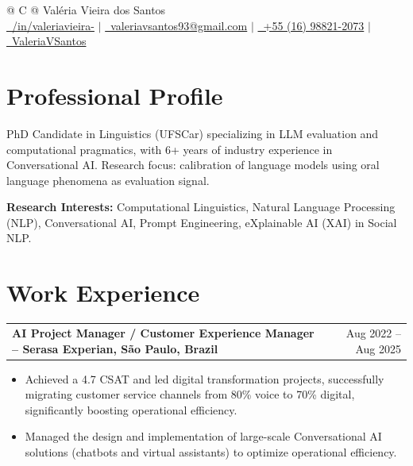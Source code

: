 \documentclass[a4paper]{article}
\makeatletter
\newenvironment{joblong}[2]
    {
    \begin{tabularx}{\linewidth}{@{}X r@{}}
    \textbf{#1} & #2 \\[3.75pt]
    \end{tabularx}
    \begin{minipage}[t]{\linewidth}
    \begin{itemize}[nosep,after=\strut, leftmargin=1em, itemsep=3pt,label=--]
    }
    {
    \end{itemize}
    \end{minipage}
    }
\makeatother
\begin{document}
\pagestyle{empty}

\begin{tabularx}{\linewidth}{@{} C @{}}
\Huge{Valéria Vieira dos Santos} \\[7.5pt]
\href{https://linkedin.com/in/valeriavieira-}{\raisebox{-0.05\height}\faLinkedin\ /in/valeriavieira-} $|$
\href{mailto:valeriavsantos93@gmail.com}{\raisebox{-0.05\height}\faEnvelope \ valeriavsantos93@gmail.com} $|$
\href{tel:+5516988212073}{\raisebox{-0.05\height}\faMobile \ +55 (16) 98821-2073} $|$
\href{https://github.com/ValeriaVSantos}{\raisebox{-0.05\height}\faGithub\ ValeriaVSantos} \\
\end{tabularx}


\section{Professional Profile}
PhD Candidate in Linguistics (UFSCar) specializing in LLM evaluation 
and computational pragmatics, with 6+ years of industry experience 
in Conversational AI. Research focus: calibration of language models 
using oral language phenomena as evaluation signal.
\vspace{5pt}

\textbf{Research Interests:} Computational Linguistics, Natural Language Processing (NLP), Conversational AI, Prompt Engineering, eXplainable AI (XAI) in Social NLP.


\section{Work Experience}

\begin{joblong}{AI Project Manager / Customer Experience Manager -- Serasa Experian, São Paulo, Brazil}{Aug 2022 – Aug 2025}
\item Achieved a 4.7 CSAT and led digital transformation projects, successfully migrating customer service channels from 80\% voice to 70\% digital, significantly boosting operational efficiency.
\item Managed the design and implementation of large-scale Conversational AI solutions (chatbots and virtual assistants) to optimize operational efficiency.
\end{joblong}
\end{document}
